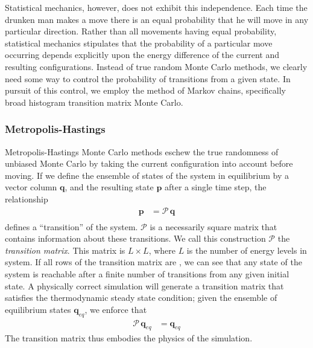 \documentclass[12pt]{article}
\begin{document}
Statistical mechanics, however, does not exhibit this independence. Each time the drunken man makes a move there is an equal probability that he will move in any particular direction. Rather than all movements having equal probability, statistical mechanics stipulates that the probability of a particular move occurring depends explicitly upon the energy difference of the current and resulting configurations. Instead of true random Monte Carlo methods, we clearly need some way to control the probability of transitions from a given state. In pursuit of this control, we employ the method of Markov chains, specifically broad histogram transition matrix Monte Carlo.
\subsubsection{Metropolis-Hastings}
Metropolis-Hastings Monte Carlo methods eschew the true randomness of unbiased Monte Carlo by taking the current configuration into account before moving. If we define the ensemble of states of the system in equilibrium by a vector column $\mathbf{q}$, and the resulting state $\mathbf{p}$ after a single time step, the relationship
\begin{align*}
    \mathbf{p} &= \mathcal{P}\, \mathbf{q}\\
\end{align*}
defines a ``transition'' of the system. $\mathcal{P}$ is a necessarily square matrix that contains information about these transitions. We call this construction $\mathcal{P}$ the {\it transition matrix}. This matrix is $L\times L$, where $L$ is the number of energy levels in system. If all rows of the transition matrix are , we can see that any state of the system is reachable after a finite number of transitions from any given initial state. A physically correct simulation will generate a transition matrix that satisfies the thermodynamic steady state condition; given the ensemble of equilibrium states $\mathbf{q}_{eq}$, we enforce that
\begin{align}
    \mathcal{P}\,\mathbf{q}_{eq} &= \mathbf{q}_{eq}
    \label{thermo-steady-state}
\end{align}
The transition matrix thus embodies the physics of the simulation.
\end{document}
